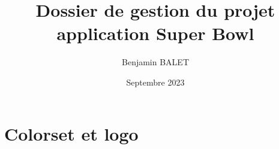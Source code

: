 \documentclass{book}
\title{Dossier de gestion du projet application Super Bowl}
\author{Benjamin BALET}
\date{Septembre 2023}
\begin{document}
\maketitle{}
\tableofcontents
\newpage

\chapter{Colorset et logo}



\begin{appendix}
    \listoffigures
    \listoftables
  \end{appendix}
\end{document}
